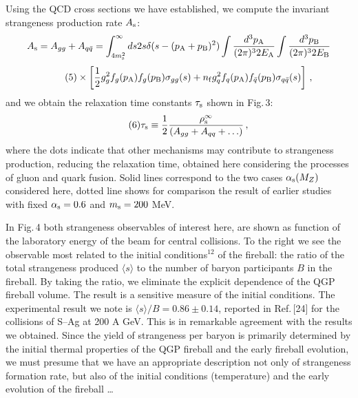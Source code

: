 \begin{mdframed}[linecolor=gray,roundcorner=12pt,backgroundcolor=Dandelion!15,linewidth=1pt,leftmargin=0cm,rightmargin=0cm,topline=true,bottomline=true,skipabove=12pt]
Using the QCD cross sections we have established, we compute the invariant strangeness production rate $A_{\rm s}$:
\begin{equation}
\notag 
A_{\rm s}= A_{gg}+A_{q\bar q}=\int_{4m_{\rm s}^2}^{\infty}ds
2s\delta (s-(p_{\rm A}+p_{\rm B})^2)
\int{d^3p_{\rm A}\over(2\pi)^32E_{\rm A}}\int{d^3p_{\rm
B}\over(2\pi)^32E_{\rm B}} 
\end{equation}
\begin{equation}
\tag{5}
\times\left[{1\over 2} g_g^2f_g(p_{\rm A})f_g(p_{\rm B})
{\sigma_{gg}}(s) + n_{\rm f}g_q^2 f_q(p_{\rm A})
f_{\bar q}(p_{\rm B}){\sigma_{q\bar q}}(s)\right]\,,
\end{equation}
and we obtain the relaxation time constants $\tau_{\rm s}$ shown in
Fig.\,3:
\begin{equation}%
\tag{6}
\tau_{\rm s}\equiv
{1\over 2}{\rho_{\rm s}^\infty\over{(A_{gg}+A_{qq}+\ldots)}}\,,
\end{equation}
where the dots indicate that other mechanisms may contribute to strangeness production, reducing the relaxation time, obtained here considering the processes of gluon and quark fusion. Solid lines correspond to the two cases $\alpha_{\rm s}(M_Z)$ considered here, dotted line shows for comparison  the result of earlier studies with fixed   $\alpha_{\rm s}=0.6$ and $m_{\rm s}=200$ MeV.   

In Fig.\,4 both strangeness observables of interest here, are shown as function of the laboratory energy of the beam for central collisions.  To the right we see the observable most related to the initial conditions$^{12}$  
of the fireball: the ratio of the total strangeness produced $\langle s \rangle$ to the number of baryon participants $B$ in the fireball. By taking the ratio, we eliminate the explicit dependence of the QGP fireball volume. The result is a sensitive measure of the initial conditions. The experimental result we note is $\langle s \rangle/B=0.86\pm0.14$, reported in Ref.\,[24] for the collisions of S--Ag at 200 A GeV. This is in remarkable agreement with the results we obtained. Since the yield of strangeness per baryon is primarily determined  by the initial thermal properties of the QGP fireball and the early fireball evolution, we must presume that we have an appropriate description not only of strangeness formation rate, but also of the initial conditions (temperature) and the early evolution of the fireball \ldots 


\end{mdframed}
